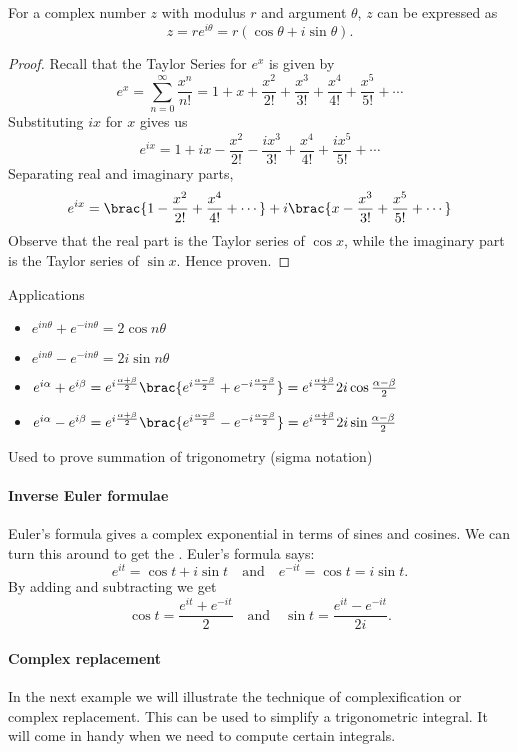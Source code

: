 \begin{theorem}
For a complex number $z$ with modulus $r$ and argument $\theta$, $z$ can be expressed as
\[ z=re^{i\theta} = r(\cos\theta+i\sin\theta). \]
\end{theorem}

\begin{proof}
	Recall that the Taylor Series for $e^x$ is given by
	\[ e^x = \sum_{n=0}^\infty \frac{x^n}{n!} = 1+x+\frac{x^2}{2!}+\frac{x^3}{3!}+\frac{x^4}{4!}+\frac{x^5}{5!}+\cdots \]
	Substituting $ix$ for $x$ gives us
	\[ e^{ix} = 1+ix-\frac{x^2}{2!}-\frac{ix^3}{3!}+\frac{x^4}{4!}+\frac{ix^5}{5!}+\cdots \]
	Separating real and imaginary parts,
	\[ e^{ix} = \brac{1-\frac{x^2}{2!}+\frac{x^4}{4!}+\cdots} + i\brac{x-\frac{x^3}{3!}+\frac{x^5}{5!}+\cdots} \]
	Observe that the real part is the Taylor series of $\cos x$, while the imaginary part is the Taylor series of $\sin x$. Hence proven.
\end{proof}

Applications
\begin{itemize}
\item $e^{in\theta}+e^{-in\theta}=2\cos n\theta$
\item $e^{in\theta}-e^{-in\theta}=2i\sin n\theta$
\item $e^{i\alpha}+e^{i\beta}=e^{i\frac{\alpha+\beta}{2}}\brac{e^{i\frac{\alpha-\beta}{2}}+e^{-i\frac{\alpha-\beta}{2}}}=e^{i\frac{\alpha+\beta}{2}}2i\cos\frac{\alpha-\beta}{2}$
\item $e^{i\alpha}-e^{i\beta}=e^{i\frac{\alpha+\beta}{2}}\brac{e^{i\frac{\alpha-\beta}{2}}-e^{-i\frac{\alpha-\beta}{2}}}=e^{i\frac{\alpha+\beta}{2}}2i\sin\frac{\alpha-\beta}{2}$
\end{itemize}
Used to prove summation of trigonometry (sigma notation)

\paragraph{Inverse Euler formulae}
Euler's formula gives a complex exponential in terms of sines and cosines. We can turn this around to get the . Euler’s formula says:
\[ e^{it}=\cos t+i\sin t \quad \text{and} \quad e^{-it}=\cos t=i\sin t. \]
By adding and subtracting we get
\[ \cos t=\frac{e^{it}+e^{-it}}{2} \quad \text{and} \quad \sin t=\frac{e^{it}-e^{-it}}{2i}. \]

\paragraph{Complex replacement}
In the next example we will illustrate the technique of complexification or complex replacement. This can be used to simplify a trigonometric integral. It will come in handy when we need to compute certain integrals.

